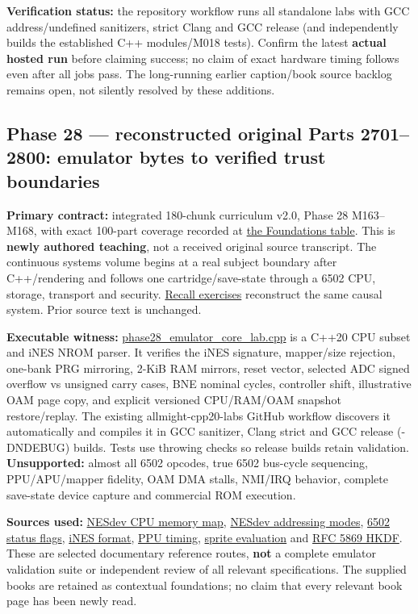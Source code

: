 \textbf{Verification status:} the repository workflow runs all standalone labs with GCC address/undefined sanitizers, strict Clang and GCC release (and independently builds the established C++ modules/M018 tests). Confirm the latest \textbf{actual hosted run} before claiming success; no claim of exact hardware timing follows even after all jobs pass. The long-running earlier caption/book source backlog remains open, not silently resolved by these additions.

\subsection{Phase 28 --- reconstructed original Parts 2701--2800: emulator bytes to verified trust boundaries}\label{appendix-a103e7846d21-phase-28-reconstructed-original-parts-27012800-emulator-bytes-to-verified-trust-boundaries}

\textbf{Primary contract:} integrated 180-chunk curriculum v2.0, Phase 28 M163--M168, with exact 100-part coverage recorded at \hyperref[appendix-fd090d982a15-phase-28-m163m168-parts-27012800-deterministic-and-trusted-low-level-systems]{the Foundations table}. This is \textbf{newly authored teaching}, not a received original source transcript. {The continuous systems volume} begins at a real subject boundary after C++/rendering and follows one cartridge/save-state through a 6502 CPU, storage, transport and security. \hyperref[appendix-11f73b337e37]{Recall exercises} reconstruct the same causal system. Prior source text is unchanged.

\textbf{Executable witness:} \hyperref[source-file-552a9e2296dc984412c8f06d]{phase28\_emulator\_core\_lab.cpp} is a C++20 CPU subset and iNES NROM parser. It verifies the iNES signature, mapper/size rejection, one-bank PRG mirroring, 2-KiB RAM mirrors, reset vector, selected ADC signed overflow vs unsigned carry cases, BNE nominal cycles, controller shift, illustrative OAM page copy, and explicit versioned CPU/RAM/OAM snapshot restore/replay. The existing allmight-cpp20-labs GitHub workflow discovers it automatically and compiles it in GCC sanitizer, Clang strict and GCC release (-DNDEBUG) builds. Tests use throwing checks so release builds retain validation. \textbf{Unsupported:} almost all 6502 opcodes, true 6502 bus-cycle sequencing, PPU/APU/mapper fidelity, OAM DMA stalls, NMI/IRQ behavior, complete save-state device capture and commercial ROM execution.

\textbf{Sources used:} \href{https://www.nesdev.org/wiki/CPU_memory_map}{NESdev CPU memory map}, \href{https://www.nesdev.org/wiki/Addressing_modes}{NESdev addressing modes}, \href{https://www.nesdev.org/wiki/Status_flag}{6502 status flags}, \href{https://www.nesdev.org/wiki/INES}{iNES format}, \href{https://www.nesdev.org/wiki/PPU_frame_timing}{PPU timing}, \href{https://www.nesdev.org/wiki/PPU_sprite_evaluation}{sprite evaluation} and \href{https://www.rfc-editor.org/rfc/rfc5869.html}{RFC 5869 HKDF}. These are selected documentary reference routes, \textbf{not} a complete emulator validation suite or independent review of all relevant specifications. The supplied books are retained as contextual foundations; no claim that every relevant book page has been newly read.

